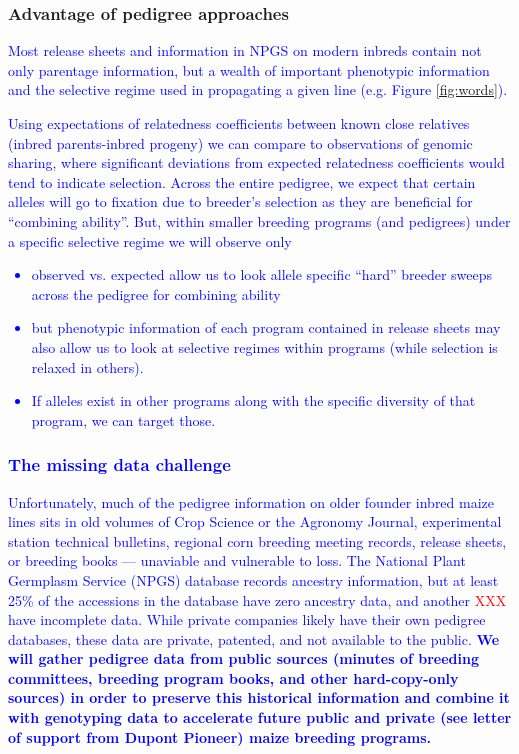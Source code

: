 \documentclass[12pt]{article}
\begin{document}
 
\subsubsection*{Advantage of pedigree approaches}
\textcolor{blue}{Most release sheets and information in NPGS on modern inbreds contain not only parentage information, but a wealth of important phenotypic information and the selective regime used in propagating a given line (e.g. Figure \ref{fig:words}). 

Using expectations of relatedness coefficients between known close relatives (inbred parents-inbred progeny) we can compare to observations of genomic sharing, where significant deviations from expected relatedness coefficients would tend to indicate selection. 
Across the entire pedigree, we expect that certain alleles will go to fixation due to breeder's selection as they are beneficial for ``combining ability''. 
But, within smaller breeding programs (and pedigrees) under a specific selective regime we will observe only 

\textcolor{blue}{
\begin{itemize}
\item observed vs. expected allow us to look allele specific ``hard'' breeder sweeps across the pedigree for combining ability
\item but phenotypic information of each program contained in release sheets may also allow us to look at selective regimes within programs (while selection is relaxed in others).
\item If alleles exist in other programs along with the specific diversity of that program, we can target those.
\end{itemize}}

\subsubsection*{The missing data challenge}

Unfortunately, much of the pedigree information on older founder inbred maize lines sits in old volumes of Crop Science or the Agronomy Journal, experimental station technical bulletins, regional corn breeding meeting records, release sheets, or breeding books --- unaviable and vulnerable to loss.  
The National Plant Germplasm Service (NPGS) database records ancestry information, but at least 25\% of the accessions in the database have zero ancestry data, and another \textcolor{red}{XXX} have incomplete data. 
While private companies likely have their own pedigree databases, these data are private, patented, and not available to the public. 
\textbf{We will gather pedigree data from public sources (minutes of breeding committees, breeding program books, and other hard-copy-only sources) in order to preserve this historical information and combine it with genotyping data to accelerate future public and private (see letter of support from Dupont Pioneer) maize breeding programs.}

}
\end{document}
